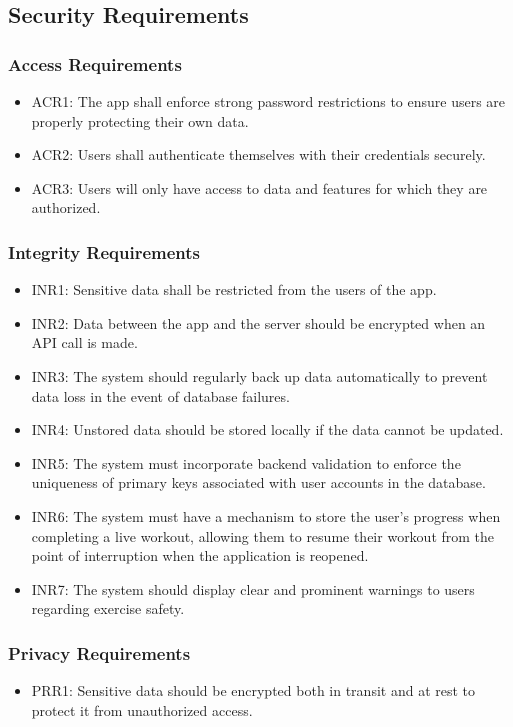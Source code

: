 \documentclass[12pt]{article}
\begin{document}
\subsection{Security Requirements}
\subsubsection{Access Requirements}
\begin{itemize}
    \item ACR1: The app shall enforce strong password restrictions to ensure users are properly protecting their own data.
    \item ACR2: Users shall authenticate themselves with their credentials securely.
    \item ACR3: Users will only have access to data and features for which they are authorized.
\end{itemize}

\subsubsection{Integrity Requirements}
\begin{itemize}
    \item INR1: Sensitive data shall be restricted from the users of the app.
    \item INR2: Data between the app and the server should be encrypted when an API call is made.
    \item INR3: The system should regularly back up data automatically to prevent data loss in the event of database failures.
    \item INR4: Unstored data should be stored locally if the data cannot be updated.
    \item INR5: The system must incorporate backend validation to enforce the uniqueness of primary keys associated with user accounts in the database.
    \item INR6: The system must have a mechanism to store the user's progress when completing a live workout, allowing them to resume their workout from the point of interruption when the application is reopened.
    \item INR7: The system should display clear and prominent warnings to users regarding exercise safety.
\end{itemize}

\subsubsection{Privacy Requirements}
\begin{itemize}
    \item PRR1: Sensitive data should be encrypted both in transit and at rest to protect it from unauthorized access.
\end{itemize}
\end{document}
